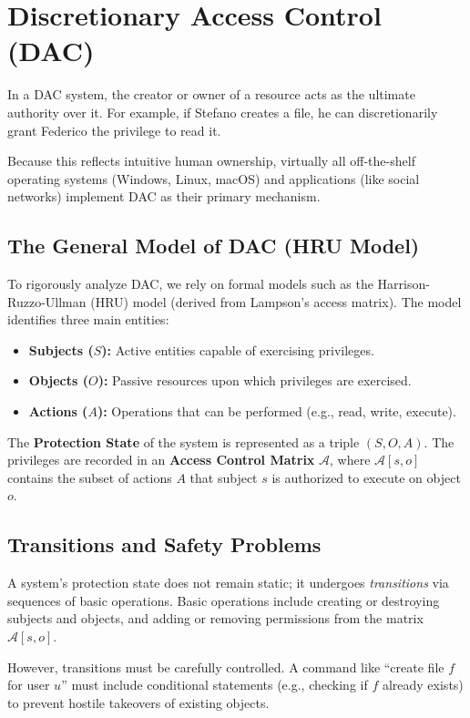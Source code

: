 \section{Discretionary Access Control (DAC)}
In a DAC system, the creator or owner of a resource acts as the ultimate authority over it. For example, if Stefano creates a file, he can discretionarily grant Federico the privilege to read it. 

Because this reflects intuitive human ownership, virtually all off-the-shelf operating systems (Windows, Linux, macOS) and applications (like social networks) implement DAC as their primary mechanism.

\subsection{The General Model of DAC (HRU Model)}
To rigorously analyze DAC, we rely on formal models such as the Harrison-Ruzzo-Ullman (HRU) model (derived from Lampson's access matrix). The model identifies three main entities:
\begin{itemize}
    \item \textbf{Subjects ($S$):} Active entities capable of exercising privileges.
    \item \textbf{Objects ($O$):} Passive resources upon which privileges are exercised.
    \item \textbf{Actions ($A$):} Operations that can be performed (e.g., read, write, execute).
\end{itemize}

The \textbf{Protection State} of the system is represented as a triple $(S, O, A)$. The privileges are recorded in an \textbf{Access Control Matrix} $\mathcal{A}$, where $\mathcal{A}[s,o]$ contains the subset of actions $A$ that subject $s$ is authorized to execute on object $o$. 

\subsection{Transitions and Safety Problems}
A system's protection state does not remain static; it undergoes \textit{transitions} via sequences of basic operations. Basic operations include creating or destroying subjects and objects, and adding or removing permissions from the matrix $\mathcal{A}[s,o]$. 

However, transitions must be carefully controlled. A command like ``create file $f$ for user $u$'' must include conditional statements (e.g., checking if $f$ already exists) to prevent hostile takeovers of existing objects.

